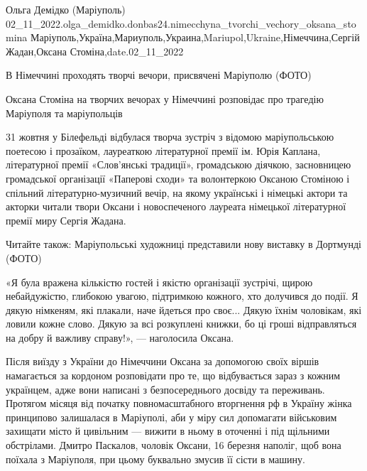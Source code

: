  
 
 
 
 

Ольга Демідко (Маріуполь)
02_11_2022.olga_demidko.donbas24.nimecchyna_tvorchi_vechory_oksana_stomina
Маріуполь,Україна,Мариуполь,Украина,Mariupol,Ukraine,Німеччина,Сергій Жадан,Оксана Стоміна,date.02_11_2022

В Німеччині проходять творчі вечори, присвячені Маріуполю (ФОТО)

Оксана Стоміна на творчих вечорах у Німеччині розповідає про трагедію Маріуполя та маріупольців

31 жовтня у Білефельді відбулася творча зустріч з відомою маріупольською
поетесою і прозаїком, лауреаткою літературної премії ім. Юрія Каплана,
літературної премії «Слов'янські традиції», громадською діячкою, засновницею
громадської організації «Паперові сходи» та волонтеркою Оксаною Стоміною і
спільний літературно-музичний вечір, на якому українські і німецькі актори та
акторки читали твори Оксани і новоспеченого лауреата німецької літературної
премії миру Сергія Жадана.

Читайте також: Маріупольські художниці представили нову виставку в Дортмунді
(ФОТО)

«Я була вражена кількістю гостей і якістю організації зустрічі, щирою
небайдужістю, глибокою увагою, підтримкою кожного, хто долучився до події. Я
дякую німкеням, які плакали, наче йдеться про своє... Дякую їхнім чоловікам, які
ловили кожне слово. Дякую за всі розкуплені книжки, бо ці гроші відправляться
на добру й важливу справу!», — наголосила Оксана. 

Після виїзду з України до Німеччини Оксана за допомогою своїх віршів
намагається за кордоном розповідати про те, що відбувається зараз з кожним
українцем, адже вони написані з безпосереднього досвіду та переживань. Протягом
місяця від початку повномасштабного вторгнення рф в Україну жінка принципово
залишалася в Маріуполі, аби у міру сил допомагати військовим захищати місто й
цивільним — вижити в ньому в оточенні і під щільними обстрілами. Дмитро
Паскалов, чоловік Оксани, 16 березня наполіг, щоб вона поїхала з Маріуполя, при
цьому буквально змусив її сісти в машину.

